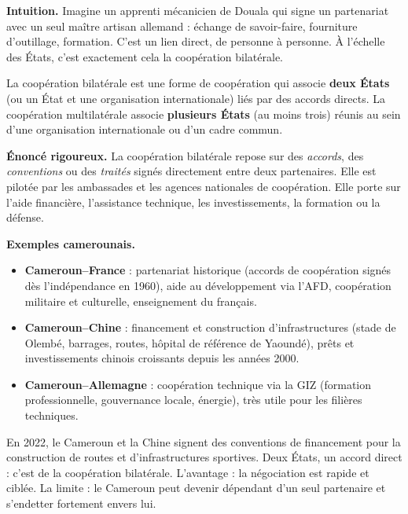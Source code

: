 \documentclass[11pt]{article}
\newcommand{\cle}[1]{{\popxbold\color{popdark}#1}}
\newcounter{popsec}
\newcounter{popsub}
\newcommand{\courssub}[1]{%
  \stepcounter{popsub}%
  \par\vspace{9pt}\noindent{\popxbold\fontsize{11.5}{13}\selectfont\color{popink}{\color{poporange}\thepopsec.\thepopsub}\hspace{6pt}#1}\par\nopagebreak\vspace{4pt}
}
\begin{document}
\courssub{La coopération bilatérale}

\textbf{Intuition.} Imagine un apprenti mécanicien de Douala qui signe un partenariat avec un seul maître artisan allemand : échange de savoir-faire, fourniture d'outillage, formation. C'est un lien direct, de personne à personne. À l'échelle des États, c'est exactement cela la coopération bilatérale.

\begin{definition}
La \cle{coopération bilatérale} est une forme de coopération qui associe \textbf{deux États} (ou un État et une organisation internationale) liés par des accords directs. La \cle{coopération multilatérale} associe \textbf{plusieurs États} (au moins trois) réunis au sein d'une organisation internationale ou d'un cadre commun.
\end{definition}

\textbf{Énoncé rigoureux.} La coopération bilatérale repose sur des \emph{accords}, des \emph{conventions} ou des \emph{traités} signés directement entre deux partenaires. Elle est pilotée par les ambassades et les agences nationales de coopération. Elle porte sur l'aide financière, l'assistance technique, les investissements, la formation ou la défense.

\textbf{Exemples camerounais.}

\begin{itemize}
\item \textbf{Cameroun--France} : partenariat historique (accords de coopération signés dès l'indépendance en 1960), aide au développement via l'AFD, coopération militaire et culturelle, enseignement du français.
\item \textbf{Cameroun--Chine} : financement et construction d'infrastructures (stade de Olembé, barrages, routes, hôpital de référence de Yaoundé), prêts et investissements chinois croissants depuis les années 2000.
\item \textbf{Cameroun--Allemagne} : coopération technique via la GIZ (formation professionnelle, gouvernance locale, énergie), très utile pour les filières techniques.
\end{itemize}

\begin{exemplebox}
En 2022, le Cameroun et la Chine signent des conventions de financement pour la construction de routes et d'infrastructures sportives. Deux États, un accord direct : c'est de la coopération \cle{bilatérale}. L'avantage : la négociation est rapide et ciblée. La limite : le Cameroun peut devenir dépendant d'un seul partenaire et s'endetter fortement envers lui.
\end{exemplebox}
\end{document}
